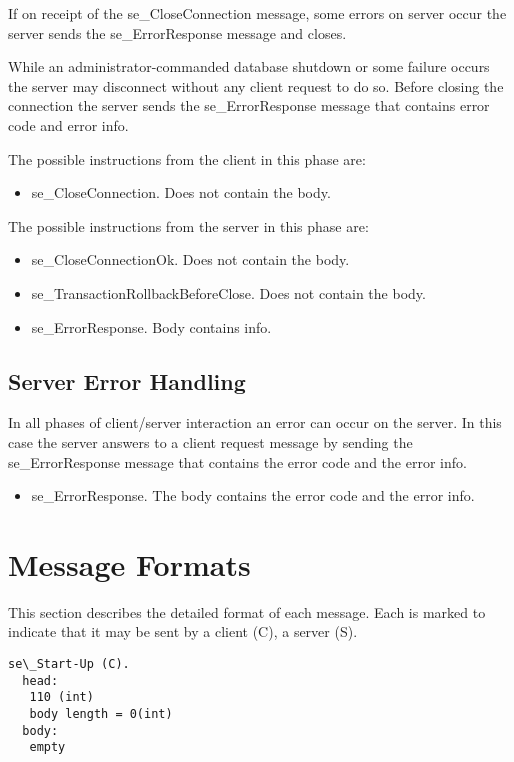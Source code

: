 \documentclass[a4paper,12pt]{article}
\begin{document}
If on receipt of the se\_CloseConnection message, some errors on server occur the server sends the se\_ErrorResponse message and closes.

While an administrator-commanded database shutdown or some failure occurs the server may disconnect without any client request to do so. Before closing the connection the server sends the se\_ErrorResponse message that contains error code and error info. 

The possible instructions from the client in this phase are:
\begin{itemize}
\item se\_CloseConnection. Does not contain the body. 
\end{itemize}

The possible instructions from the server in this phase are:
\begin{itemize}
\item se\_CloseConnectionOk. Does not contain the body. 
\item se\_TransactionRollbackBeforeClose. Does not contain the body.
\item se\_ErrorResponse. Body contains info.
\end{itemize}

\subsection{Server Error Handling}

In all phases of client/server interaction an error can occur on the server. In this case the server answers to a client request message by sending the se\_ErrorResponse message that contains the error code and the error info.

\begin{itemize}
\item se\_ErrorResponse. The body contains the error code and the error info. 
\end{itemize}



\section{Message Formats}

This section describes the detailed format of each message. Each is marked to indicate that it may be sent by a client (C), a server (S).

\begin{verbatim}
se\_Start-Up (C).
  head:
   110 (int)
   body length = 0(int)
  body:
   empty
\end{verbatim}   
\end{document}
